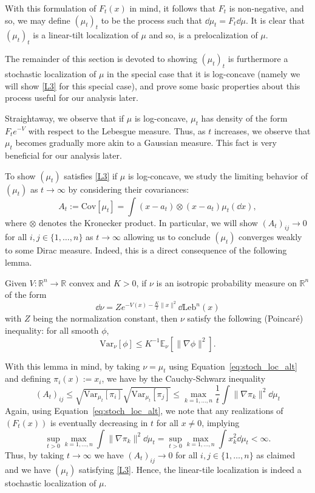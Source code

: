 With this formulation of \(F_t(x)\) in mind, it follows that \(F_t\) is non-negative, and so, 
we may define \((\mu_t)_t\) to be the process such that \(\dd \mu_t = F_t \dd \mu\). It is clear that 
\((\mu_t)_t\) is a linear-tilt localization of \(\mu\) and so, is a prelocalization of \(\mu\). 

The remainder of this section is devoted to showing \((\mu_t)_t\) is furthermore a stochastic localization 
of \(\mu\) in the special case that it is log-concave (namely we will show \eqref{L3} for this special case), and prove 
some basic properties about this process useful for our analysis later.

Straightaway, we observe that if \(\mu\) is log-concave, \(\mu_t\) has density of the form \(F_t e^{-V}\) with respect 
to the Lebesgue measure. Thus, as \(t\) increases, we observe that \(\mu_t\) becomes gradually more 
akin to a Gaussian measure. This fact is very beneficial for our analysis later.

To show \((\mu_t)\) satisfies \eqref{L3} if \(\mu\) is log-concave, we study the limiting behavior of 
\((\mu_t)\) as \(t \to \infty\) by considering their covariances:
\begin{equation}
  A_t := \text{Cov}[\mu_t] = \int (x - a_t) \otimes (x - a_t) \mu_t(\dd x),
\end{equation}
where \(\otimes\) denotes the Kronecker product. In particular, we will show \((A_t)_{ij} \to 0\) for all
 \(i, j \in \{1, \ldots, n\}\) as \(t \to \infty\) allowing us to conclude \((\mu_t)\) converges weakly 
 to some Dirac measure. Indeed, this is a direct consequence of the following lemma.

\begin{lemma}\label{lem:brascamp-lieb}
  Given \(V : \mathbb{R}^n \to \mathbb{R}\) convex and \(K > 0\), if \(\nu\) is an isotropic 
  probability measure on \(\mathbb{R}^n\) of the form 
  \[\dd \nu = Ze^{-V(x) - \frac{K}{2}\|x\|^2}\dd \text{Leb}^n(x)\]
  with \(Z\) being the normalization constant, then \(\nu\) satisfy the following (Poincaré) inequality:
  for all smooth \(\phi\),
  \[\text{Var}_\nu[\phi] \le K^{-1} \mathbb{E}_\nu[\|\nabla\phi\|^2].\]
\end{lemma}

With this lemma in mind, by taking \(\nu = \mu_t\) using 
Equation~\eqref{eq:stoch_loc_alt} and defining
\(\pi_i(x) := x_i\), we have by the Cauchy-Schwarz inequality
\[(A_t)_{ij} \le \sqrt{\text{Var}_{\mu_t}[\pi_i]}\sqrt{\text{Var}_{\mu_t}[\pi_j]} 
  \le \max_{k = 1, \ldots, n} \frac{1}{t}\int \|\nabla \pi_k\|^2 \dd \mu_t\]
Again, using Equation~\eqref{eq:stoch_loc_alt}, we note that any realizations of \((F_t(x))\) is eventually 
decreasing in \(t\) for all \(x \neq 0\), implying 
\[\sup_{t > 0} \max_{k = 1, \ldots, n} \int \|\nabla \pi_k\|^2 \dd \mu_t = 
\sup_{t > 0} \max_{k = 1, \ldots, n} \int x_k^2 \dd \mu_t < \infty.\] 
Thus, by taking \(t \to \infty\) we have \((A_t)_{ij} \to 0\) for all \(i, j \in \{1, \ldots, n\}\) as claimed 
and we have \((\mu_t)\) satisfying \eqref{L3}. Hence, the linear-tile localization is indeed a stochastic localization of \(\mu\).

